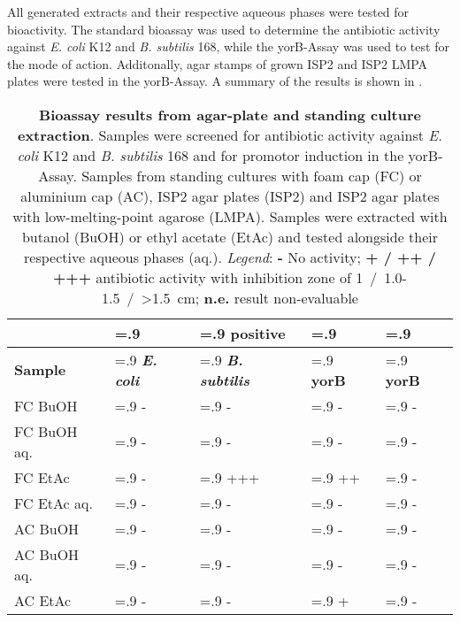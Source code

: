     All generated extracts and their respective aqueous phases were tested for bioactivity.
    The standard bioassay was used to determine the antibiotic activity against \textit{E. coli} K12 and \textit{B. subtilis} 168, while the yorB-Assay was used to test for the mode of action.
    Additonally, agar stamps of grown ISP2 and ISP2 LMPA plates were tested in the yorB-Assay.
    A summary of the results is shown in .

    \begin{table}[htbp]
        \caption[Bioassay results from agar-plate and standing culture extraction]{%
        	\textbf{Bioassay results from agar-plate and standing culture extraction}.
	        Samples were screened for antibiotic activity against \textit{E. coli} K12 and \textit{B. subtilis} 168 and for promotor induction in the yorB-Assay.
	        Samples from standing cultures with foam cap (FC) or aluminium cap (AC), ISP2 agar plates (ISP2) and ISP2 agar plates with low-melting-point agarose (LMPA).
	        Samples were extracted with butanol (BuOH) or ethyl acetate (EtAc) and tested alongside their respective aqueous phases (aq.).
	        \emph{Legend}: \textbf{-} No activity; \textbf{+ / ++ / +++} antibiotic activity with inhibition zone of 1~/~1.0-1.5~/~>1.5~cm; \textbf{n.e.} result non-evaluable}
        \label{tab:yorB_assay_results}
        \centering
        \begin{tabularx}{\textwidth}{>{\hsize=1.4\hsize}X>{\hsize=.9\hsize}X>{\hsize=.9\hsize}X>{\hsize=.9\hsize}X>{\hsize=.9\hsize}X}
            \toprule
            & \multicolumn{3}{c}{Antibacterial} & positive \\
            \cline{2-4}
            \textbf{Sample} & \textbf{\textit{E. coli}}     & \textbf{\textit{B. subtilis}}  & \textbf{yorB}  & \textbf{yorB}    \\
            \midrule
            FC BuOH         & -     & -     & -     & -    \\
            FC BuOH aq.     & -     & -     & -     & -    \\
            FC EtAc         & -     & +++   & ++    & -    \\
            FC EtAc aq.     & -     & -     & -     & -    \\
            AC BuOH         & -     & -     & -     & -    \\
            AC BuOH aq.     & -     & -     & -     & -    \\
            AC EtAc         & -     & -     & +     & -    \\

\end{tabularx}
\end{table}
